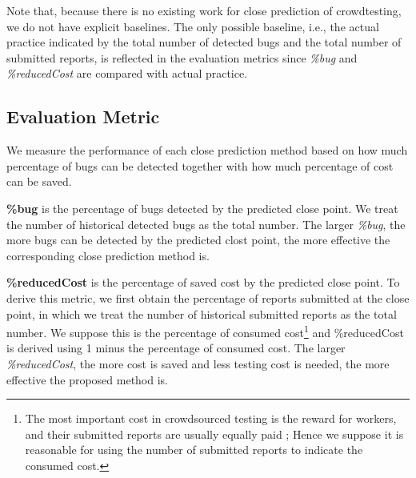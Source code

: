 \documentclass[sigconf,review, anonymous]{acmart}
\begin{document}
Note that, because there is no existing work for close prediction of crowdtesting, we do not have explicit baselines.
The only possible baseline, i.e., the actual practice indicated by the total number of detected bugs and the total number of submitted reports, is reflected in the evaluation metrics since \textit{\%bug} and \textit{\%reducedCost} are compared with actual practice. 


\subsection{Evaluation Metric}
\label{subsec:design_metric}

We measure the performance of each close prediction method based on how much percentage of bugs can be detected together with how much percentage of cost can be saved.
 

\textbf{\%bug} is the percentage of bugs detected by the predicted close point.
We treat the number of historical detected bugs as the total number.
The larger \textit{\%bug}, the more bugs can be detected by the predicted clost point, the more effective the corresponding close prediction method is.

\textbf{\%reducedCost} is the percentage of saved cost by the predicted close point.
To derive this metric, we first obtain the percentage of reports submitted at the close point, in which we treat the number of historical submitted reports as the total number.
We suppose this is the percentage of consumed cost\footnote{The most important cost in crowdsourced testing is the reward for workers, and their submitted reports are usually equally paid \cite{cui2017multi,cui2017who}; Hence we suppose it is reasonable for using the number of submitted reports to indicate the consumed cost.} and \%reducedCost is derived using 1 minus the percentage of consumed cost.
The larger \textit{\%reducedCost}, the more cost is saved and less testing cost is needed, the more effective the proposed method is.
\end{document}
